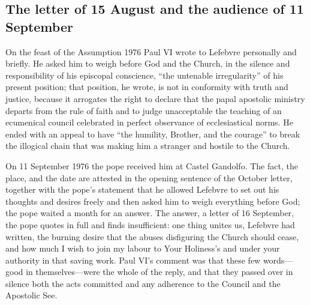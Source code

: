 \subsection{The letter of 15 August and the audience of 11 September}

On the feast of the Assumption 1976 Paul VI wrote to Lefebvre personally
and briefly. He asked him to weigh before God and the Church, in the
silence and responsibility of his episcopal conscience, ``the untenable
irregularity'' of his present position; that position, he wrote, is not
in conformity with truth and justice, because it arrogates the right to
declare that the papal apostolic ministry departs from the rule of faith
and to judge unacceptable the teaching of an ecumenical council
celebrated in perfect observance of ecclesiastical norms. He ended with
an appeal to have ``the humility, Brother, and the courage'' to break the
illogical chain that was making him a stranger and hostile to the
Church.

On 11 September 1976 the pope received him at Castel Gandolfo. The fact,
the place, and the date are attested in the opening sentence of the
October letter, together with the pope's statement that he allowed
Lefebvre to set out his thoughts and desires freely and then asked him to
weigh everything before God; the pope waited a month for an
answer. The answer, a letter of 16 September, the pope quotes
in full and finds insufficient: one thing unites us, Lefebvre had
written, the burning desire that the abuses disfiguring the Church should
cease, and how much I wish to join my labour to Your Holiness's and under
your authority in that saving work. Paul VI's comment was that these few
words---good in themselves---were the whole of the reply, and that they
passed over in silence both the acts committed and any adherence to the
Council and the Apostolic See.

